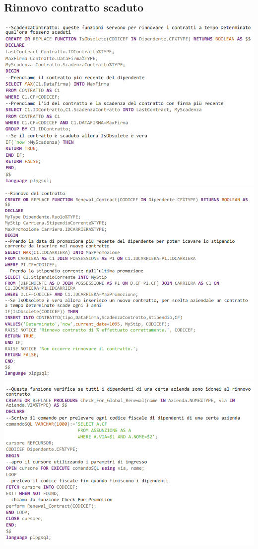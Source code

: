 \subsection{Rinnovo contratto scaduto}
\includegraphics[width=1\textwidth]{Immagini/funzione2.sql}
\includegraphics[width=1.1\textwidth]{Immagini/funzione2.1.sql}
\includegraphics[width=1.1\textwidth]{Immagini/funzione2.2.sql}

